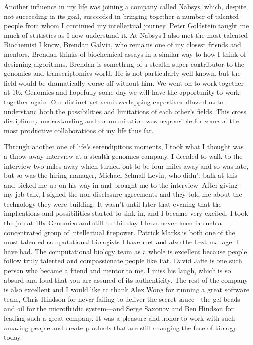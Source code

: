 \begin{acknowledgements}
Another influence in my life was joining a company called Nabsys, which, despite not succeeding in its goal, succeeded in bringing together a number of talented people from whom I continued my intellectual journey. Peter Goldstein taught me much of statistics as I now understand it. At Nabsys I also met the most talented Biochemist I know, Brendan Galvin, who remains one of my closest friends and mentors. Brendan thinks of biochemical assays in a similar way to how I think of designing algorithms. Brendan is something of a stealth super contributor to the genomics and transcriptomics world. He is not particularly well known, but the field would be dramatically worse off without him. We went on to work together at 10x Genomics and hopefully some day we will have the opportunity to work together again. Our distinct yet semi-overlapping expertises allowed us to understand both the possibilities and limitations of each other's fields. This cross disciplinary understanding and communication was responsible for some of the most productive collaborations of my life thus far.

Through another one of life's serendipitous moments, I took what I thought was a throw away interview at a stealth genomics company. I decided to walk to the interview two miles away which turned out to be four miles away and so was late, but so was the hiring manager, Michael Schnall-Levin, who didn't balk at this and picked me up on his way in and brought me to the interview. After giving my job talk, I signed the non disclosure agreements and they told me about the technology they were building. It wasn't until later that evening that the implications and possibilities started to sink in, and I became very excited. I took the job at 10x Genomics and still to this day I have never been in such a concentrated group of intellectual firepower. Patrick Marks is both one of the most talented computational biologists I have met and also the best manager I have had. The computational biology team as a whole is excellent because people follow truly talented and compassionate people like Pat. David Jaffe is one such person who became a friend and mentor to me. I miss his laugh, which is so absurd and loud that you are assured of its authenticity. The rest of the company is also excellent and I would like to thank Alex Wong for running a great software team, Chris Hindson for never failing to deliver the secret sauce---the gel beads and oil for the microfluidic system---and Serge Saxonov and Ben Hindson for leading such a great company. It was a pleasure and honor to work with such amazing people and create products that are still changing the face of biology today. 


\end{acknowledgements}
